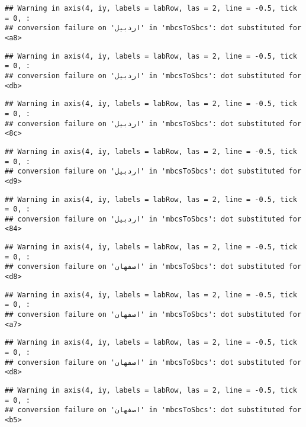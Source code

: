 \documentclass[
]{article}
\begin{document}
\begin{verbatim}
## Warning in axis(4, iy, labels = labRow, las = 2, line = -0.5, tick = 0, :
## conversion failure on 'اردبیل' in 'mbcsToSbcs': dot substituted for <a8>
\end{verbatim}

\begin{verbatim}
## Warning in axis(4, iy, labels = labRow, las = 2, line = -0.5, tick = 0, :
## conversion failure on 'اردبیل' in 'mbcsToSbcs': dot substituted for <db>
\end{verbatim}

\begin{verbatim}
## Warning in axis(4, iy, labels = labRow, las = 2, line = -0.5, tick = 0, :
## conversion failure on 'اردبیل' in 'mbcsToSbcs': dot substituted for <8c>
\end{verbatim}

\begin{verbatim}
## Warning in axis(4, iy, labels = labRow, las = 2, line = -0.5, tick = 0, :
## conversion failure on 'اردبیل' in 'mbcsToSbcs': dot substituted for <d9>
\end{verbatim}

\begin{verbatim}
## Warning in axis(4, iy, labels = labRow, las = 2, line = -0.5, tick = 0, :
## conversion failure on 'اردبیل' in 'mbcsToSbcs': dot substituted for <84>
\end{verbatim}

\begin{verbatim}
## Warning in axis(4, iy, labels = labRow, las = 2, line = -0.5, tick = 0, :
## conversion failure on 'اصفهان' in 'mbcsToSbcs': dot substituted for <d8>
\end{verbatim}

\begin{verbatim}
## Warning in axis(4, iy, labels = labRow, las = 2, line = -0.5, tick = 0, :
## conversion failure on 'اصفهان' in 'mbcsToSbcs': dot substituted for <a7>
\end{verbatim}

\begin{verbatim}
## Warning in axis(4, iy, labels = labRow, las = 2, line = -0.5, tick = 0, :
## conversion failure on 'اصفهان' in 'mbcsToSbcs': dot substituted for <d8>
\end{verbatim}

\begin{verbatim}
## Warning in axis(4, iy, labels = labRow, las = 2, line = -0.5, tick = 0, :
## conversion failure on 'اصفهان' in 'mbcsToSbcs': dot substituted for <b5>
\end{verbatim}
\end{document}
